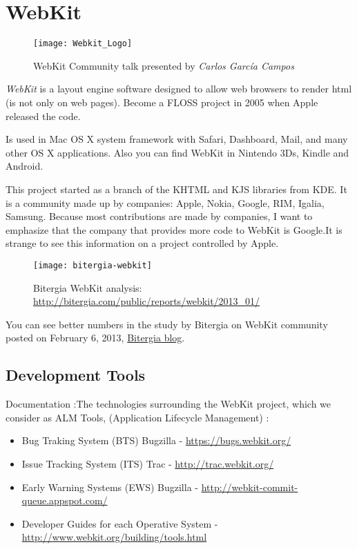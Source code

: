 \section{WebKit}
\label{sec:webkit}

\begin{figure}[H]
    \centering
    \texttt{[image: Webkit\_Logo]}
    \caption{WebKit Community talk presented by \textit{Carlos García Campos}}
    \label{webkit-logo}
\end{figure}

\par \emph{WebKit} is a layout engine software designed to allow web browsers to render html (is not only on web pages). Become a FLOSS project in 2005 when Apple released the code.

\par Is used in Mac OS X system framework with Safari, Dashboard, Mail, and many other OS X applications. Also you can find WebKit in Nintendo 3Ds, Kindle and Android.

\par This project started as a branch of the KHTML and KJS libraries from KDE. It is a community made ​​up by companies: Apple, Nokia, Google, RIM, Igalia, Samsung. Because most contributions are made by companies, I want to emphasize that the company that provides more code to WebKit is Google.It is strange to see this information on a project controlled by Apple.

\begin{figure}[H]
    \centering
    \texttt{[image: bitergia-webkit]}
    \caption{Bitergia WebKit analysis: \url{http://bitergia.com/public/reports/webkit/2013_01/}}
    \label{}
\end{figure}

\par You can see better numbers in the study by Bitergia on WebKit community posted on February 6, 2013, \href{http://blog.bitergia.com/2013/02/06/report-on-the-activity-of-companies-in-the-webkit-project/}{Bitergia blog}.

\subsection{Development Tools}

\par Documentation :The technologies surrounding the WebKit project, which we consider as ALM Tools, (Application Lifecycle Management) :
\begin{itemize}
	\item Bug Traking System (BTS) Bugzilla - \url{https://bugs.webkit.org/}
	\item Issue Tracking System (ITS) Trac - \url{http://trac.webkit.org/}
	\item Early Warning Systems (EWS) Bugzilla - \url{http://webkit-commit-queue.appspot.com/}
	\item Developer Guides for each Operative System - \url{http://www.webkit.org/building/tools.html}
\end{itemize}

